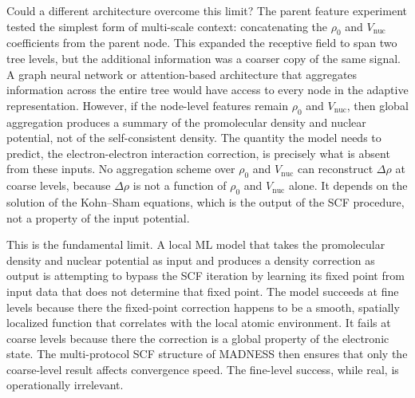 Could a different architecture overcome this limit? The parent feature
experiment tested the simplest form of multi-scale context: concatenating
the $\rho_0$ and $V_\mathrm{nuc}$ coefficients from the parent node.
This expanded the receptive field to span two tree levels, but the
additional information was a coarser copy of the same signal. A graph
neural network or attention-based architecture that aggregates
information across the entire tree would have access to every node in
the adaptive representation. However, if the node-level features remain
$\rho_0$ and $V_\mathrm{nuc}$, then global aggregation produces a
summary of the promolecular density and nuclear potential, not of the
self-consistent density. The quantity the model needs to predict, the
electron-electron interaction correction, is precisely what is absent
from these inputs. No aggregation scheme over $\rho_0$ and
$V_\mathrm{nuc}$ can reconstruct $\Delta\rho$ at coarse levels, because
$\Delta\rho$ is not a function of $\rho_0$ and $V_\mathrm{nuc}$ alone.
It depends on the solution of the Kohn--Sham equations, which is the
output of the SCF procedure, not a property of the input potential.

This is the fundamental limit. A local ML model that takes the
promolecular density and nuclear potential as input and produces a
density correction as output is attempting to bypass the SCF iteration
by learning its fixed point from input data that does not determine
that fixed point. The model succeeds at fine levels because there the
fixed-point correction happens to be a smooth, spatially localized
function that correlates with the local atomic environment. It fails
at coarse levels because there the correction is a global property of
the electronic state. The multi-protocol SCF structure of MADNESS then
ensures that only the coarse-level result affects convergence speed.
The fine-level success, while real, is operationally irrelevant.
